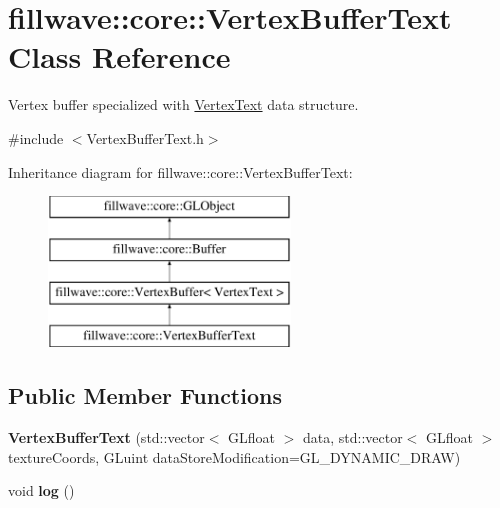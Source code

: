 \hypertarget{classfillwave_1_1core_1_1VertexBufferText}{}\section{fillwave\+:\+:core\+:\+:Vertex\+Buffer\+Text Class Reference}
\label{classfillwave_1_1core_1_1VertexBufferText}


Vertex buffer specialized with \hyperlink{structfillwave_1_1core_1_1VertexText}{Vertex\+Text} data structure.  




{\ttfamily \#include $<$Vertex\+Buffer\+Text.\+h$>$}

Inheritance diagram for fillwave\+:\+:core\+:\+:Vertex\+Buffer\+Text\+:\begin{figure}[H]
\begin{center}
\leavevmode
\includegraphics[height=4.000000cm]{classfillwave_1_1core_1_1VertexBufferText}
\end{center}
\end{figure}
\subsection*{Public Member Functions}
\begin{DoxyCompactItemize}
\item 
\hypertarget{classfillwave_1_1core_1_1VertexBufferText_a265ae86546d724bee29d581ffafb8d9b}{}{\bfseries Vertex\+Buffer\+Text} (std\+::vector$<$ G\+Lfloat $>$ data, std\+::vector$<$ G\+Lfloat $>$ texture\+Coords, G\+Luint data\+Store\+Modification=G\+L\+\_\+\+D\+Y\+N\+A\+M\+I\+C\+\_\+\+D\+R\+A\+W)\label{classfillwave_1_1core_1_1VertexBufferText_a265ae86546d724bee29d581ffafb8d9b}

\item 
\hypertarget{classfillwave_1_1core_1_1VertexBufferText_a00ac846e182cfa1f67979e5ef7ae6e22}{}void {\bfseries log} ()\label{classfillwave_1_1core_1_1VertexBufferText_a00ac846e182cfa1f67979e5ef7ae6e22}

\end{DoxyCompactItemize}
